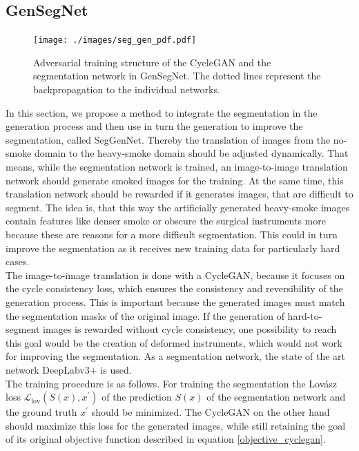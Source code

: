 \subsection{GenSegNet}
\begin{figure}[b]
    \begin{center}
     \texttt{[image: ./images/seg\_gen\_pdf.pdf]}
    \caption[Training structure GenSegNet.]{{Adversarial training structure of the CycleGAN and the segmentation network in GenSegNet. The dotted lines represent the backpropagation to the individual networks.
    }\label{seg_gen_train}}
    \end{center}
\end{figure}
In this section, we propose a method to integrate the segmentation in the generation process and then use in turn the generation to improve the segmentation, called SegGenNet. 
Thereby the translation of images from the no-smoke domain to the heavy-smoke domain should be adjusted dynamically.
That means, while the segmentation network is trained, an image-to-image translation network should generate smoked images for the training.
At the same time, this translation network should be rewarded if it generates images, that are difficult to segment.
The idea is, that this way the artificially generated heavy-smoke images contain features like denser smoke or obscure the surgical instruments more because these are reasons for a more difficult segmentation.
This could in turn improve the segmentation as it receives new training data for particularly hard cases.\\
The image-to-image translation is done with a CycleGAN, because it focuses on the cycle consistency loss, which ensures the consistency and reversibility of the generation process.
This is important because the generated images must match the segmentation masks of the original image.
If the generation of hard-to-segment images is rewarded without cycle consistency, one possibility to reach this goal would be the creation of deformed instruments, which would not work for improving the segmentation.
As a segmentation network, the state of the art network DeepLabv3+ is used.\\
The training procedure is as follows.
For training the segmentation the Lovász loss $\mathcal{L}_{\text{lov}}(S(x), x^\prime)$ of the prediction $S(x)$ of the segmentation network and the ground truth $x^\prime$ should be minimized.
The CycleGAN on the other hand should maximize this loss for the generated images, while still retaining the goal of its original objective function described in equation \ref{objective_cyclegan}.
